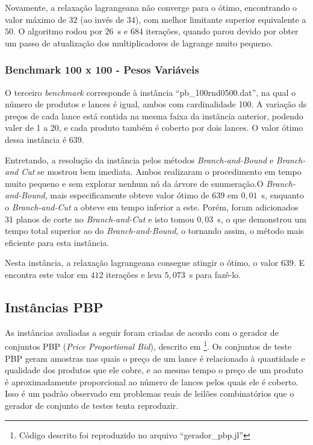 \documentclass{article}
\begin{document}
    Novamente, a relaxação lagrangeana não converge para o ótimo, encontrando o valor máximo de $32$ (ao invés de $34$), com melhor limitante superior equivalente a $50$. O algoritmo rodou por $26$~s e $684$ iterações, quando parou devido por obter um passo de atualização dos multiplicadores de lagrange muito pequeno.
    
    
    \subsubsection{Benchmark 100 x 100 - Pesos Variáveis}
    O terceiro \emph{benchmark} corresponde à instância \enquote{pb\_100rnd0500.dat}, na qual o número de produtos e lances é igual, ambos com cardinalidade 100. A variação ds preços de cada lance está contida na mesma faixa da instãncia anterior, podendo valer de 1 a 20, e cada produto também é coberto por dois lances. O valor ótimo dessa instância é $639$.
    
    
    Entretando, a resolução da instância pelos métodos \emph{Branch-and-Bound} e \emph{Branch-and Cut} se mostrou bem imediata. Ambos realizaram o procedimento em tempo muito pequeno e sem explorar nenhum nó da árvore de enumeração.O \emph{Branch-and-Bound}, mais especificamente obteve valor ótimo de $639$ em $ 0{,}01 $~s, enquanto o \emph{Branch-and-Cut} a obteve em tempo inferior a este. Porém, foram adicionados 31 planos de corte no \emph{Branch-and-Cut} e isto tomou $ 0{,}03 $~s, o que demonstrou um tempo total superior ao do \emph{Branch-and-Bound}, o tornando assim, o método mais eficiente para esta instância.
    
    
    Nesta instância, a relaxação lagrangeana consegue atingir o ótimo, o valor $639$. E encontra este valor em $412$ iterações e leva $ 5{,}073 $~s para fazê-lo.
    
    
    
    \subsection{Instâncias PBP}
    
    As instâncias avaliadas a seguir foram criadas de acordo com o gerador de conjuntos PBP (\emph{Price Proportional Bid}), descrito em \cite{guo2005using}\footnote{
    Código descrito foi reproduzido no arquivo \enquote{gerador\_pbp.jl}}.
    Os conjuntos de teste PBP geram amostras nas quais o preço de um lance é relacionado à quantidade e qualidade dos produtos que ele cobre, e ao mesmo tempo o preço de um produto é aproximadamente proporcional ao número de lances pelos quais ele é coberto. Isso é um padrão observado em problemas reais de leilões combinatórios que o gerador de conjunto de testes tenta reproduzir.
    
\end{document}
